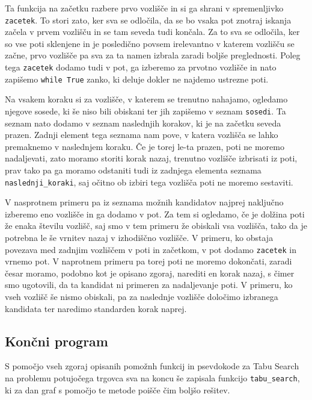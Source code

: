 \documentclass[10pt, a4paper]{article}
\begin{document}
Ta funkcija na začetku razbere prvo vozlišče in si ga shrani v spremenljivko \texttt{zacetek}. To stori zato, ker sva se odločila, da se bo vsaka pot znotraj iskanja začela v prvem vozlišču in se tam seveda tudi končala. Za to sva se odločila, ker so vse poti sklenjene in je posledično povsem irelevantno v katerem vozlišču se začne, prvo vozlišče pa sva za ta namen izbrala zaradi boljše preglednosti. Poleg tega \texttt{zacetek} dodamo tudi v pot, ga izberemo za prvotno vozlišče in nato zapišemo \texttt{while True} zanko, ki deluje dokler ne najdemo ustrezne poti.

Na vsakem koraku si za vozlišče, v katerem se trenutno nahajamo, ogledamo njegove sosede, ki še niso bili obiskani ter jih zapišemo v seznam \texttt{sosedi}. Ta seznam nato dodamo v seznam naslednjih korakov, ki je na začetku seveda prazen. Zadnji element tega seznama nam pove, v katera vozlišča se lahko premaknemo v naslednjem koraku. Če je torej le-ta prazen, poti ne moremo nadaljevati, zato moramo storiti korak nazaj, trenutno vozlišče izbrisati iz poti, prav tako pa ga moramo odstaniti tudi iz zadnjega elementa seznama \texttt{naslednji\_koraki}, saj očitno ob izbiri tega vozlišča poti ne moremo sestaviti.

V nasprotnem primeru pa iz seznama možnih kandidatov najprej naključno izberemo eno vozlišče in ga dodamo v pot. Za tem si ogledamo, če je dolžina poti že enaka številu vozlišč, saj smo v tem primeru že obiskali vsa vozlišča, tako da je potrebna le še vrnitev nazaj v izhodiščno vozlišče. V primeru, ko obstaja povezava med zadnjim vozliščem v poti in začetkom, v pot dodamo \texttt{zacetek} in vrnemo pot. V naprotnem primeru pa torej poti ne moremo dokončati, zaradi česar moramo, podobno kot je opisano zgoraj, narediti en korak nazaj, s čimer smo ugotovili, da ta kandidat ni primeren za nadaljevanje poti. V primeru, ko vseh vozlišč še nismo obiskali, pa za naslednje vozlišče določimo izbranega kandidata ter naredimo standarden korak naprej.




\subsection{Končni program}

S pomočjo vseh zgoraj opisanih pomožnh funkcij in psevdokode za Tabu Search na problemu potujočega trgovca sva na koncu še zapisala funkcijo \texttt{tabu\_search}, ki za dan graf s pomočjo te metode poišče čim boljšo rešitev.
\end{document}
